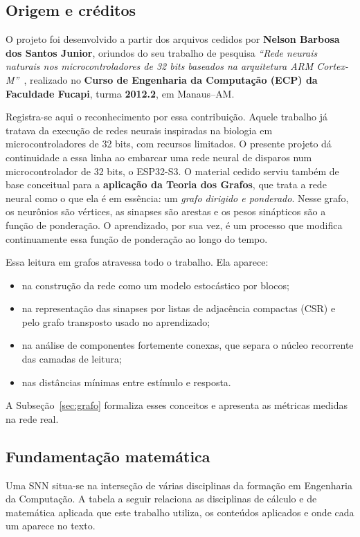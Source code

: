\documentclass[11pt,a4paper]{article}
\begin{document}
\subsection*{Origem e créditos}

O projeto foi desenvolvido a partir dos arquivos cedidos por \textbf{Nelson Barbosa dos Santos Junior}, oriundos do seu trabalho
de pesquisa \emph{“Rede neurais naturais nos microcontroladores de 32 bits baseados na arquitetura ARM Cortex-M”}~\cite{santos2012}, realizado no
\textbf{Curso de Engenharia da Computação (ECP) da Faculdade Fucapi}, turma \textbf{2012.2}, em Manaus–AM.

Registra-se aqui o reconhecimento por essa contribuição. Aquele trabalho já tratava da execução de redes neurais inspiradas na
biologia em microcontroladores de 32 bits, com recursos limitados. O presente projeto dá continuidade a essa linha ao embarcar uma
rede neural de disparos num microcontrolador de 32 bits, o ESP32-S3. O material cedido serviu também de base conceitual para a
\textbf{aplicação da Teoria dos Grafos}, que trata a rede neural como o que ela é em essência: um \emph{grafo dirigido e ponderado}. Nesse grafo, os neurônios
são vértices, as sinapses são arestas e os pesos sinápticos são a função de ponderação. O aprendizado, por sua vez, é um
processo que modifica continuamente essa função de ponderação ao longo do tempo.

Essa leitura em grafos atravessa todo o trabalho. Ela aparece:
\begin{itemize}
  \item na construção da rede como um modelo estocástico por blocos;
  \item na representação das sinapses por listas de adjacência compactas (CSR) e pelo grafo transposto usado no aprendizado;
  \item na análise de componentes fortemente conexas, que separa o núcleo recorrente das camadas de leitura;
  \item nas distâncias mínimas entre estímulo e resposta.
\end{itemize}
A Subseção~\ref{sec:grafo} formaliza esses conceitos e apresenta as métricas medidas na rede real.

\subsection*{Fundamentação matemática}

Uma SNN situa-se na interseção de várias disciplinas da formação em Engenharia da Computação. A tabela a seguir relaciona as
disciplinas de cálculo e de matemática aplicada que este trabalho utiliza, os conteúdos aplicados e onde cada um aparece no texto.
\end{document}
